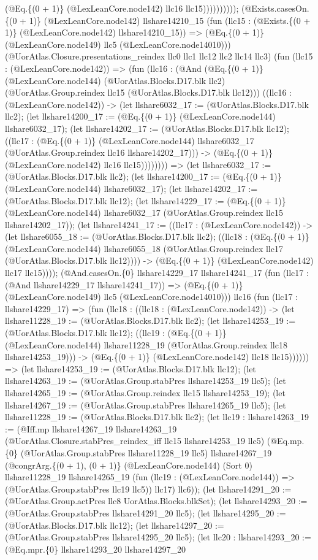\documentclass[11pt]{article}
\begin{document}
(@Eq.\{(0 + 1)\} (@LexLeanCore.node142) llc16 llc15)))))))))); (@Exists.casesOn.\{(0 + 1)\} (@LexLeanCore.node142) llshare14210\_15 (fun (llc15 : (@Exists.\{(0 + 1)\} (@LexLeanCore.node142) llshare14210\_15)) => (@Eq.\{(0 + 1)\} (@LexLeanCore.node149) llc5 (@LexLeanCore.node14010))) (@UorAtlas.Closure.presentations\_reindex llc0 llc1 llc12 llc2 llc14 llc3) (fun (llc15 : (@LexLeanCore.node142)) => (fun (llc16 : (@And (@Eq.\{(0 + 1)\} (@LexLeanCore.node144) (@UorAtlas.Blocks.D17.blk llc2) (@UorAtlas.Group.reindex llc15 (@UorAtlas.Blocks.D17.blk llc12))) ((llc16 : (@LexLeanCore.node142)) -> (let llshare6032\_17 := (@UorAtlas.Blocks.D17.blk llc2); (let llshare14200\_17 := (@Eq.\{(0 + 1)\} (@LexLeanCore.node144) llshare6032\_17); (let llshare14202\_17 := (@UorAtlas.Blocks.D17.blk llc12); ((llc17 : (@Eq.\{(0 + 1)\} (@LexLeanCore.node144) llshare6032\_17 (@UorAtlas.Group.reindex llc16 llshare14202\_17))) -> (@Eq.\{(0 + 1)\} (@LexLeanCore.node142) llc16 llc15)))))))) => (let llshare6032\_17 := (@UorAtlas.Blocks.D17.blk llc2); (let llshare14200\_17 := (@Eq.\{(0 + 1)\} (@LexLeanCore.node144) llshare6032\_17); (let llshare14202\_17 := (@UorAtlas.Blocks.D17.blk llc12); (let llshare14229\_17 := (@Eq.\{(0 + 1)\} (@LexLeanCore.node144) llshare6032\_17 (@UorAtlas.Group.reindex llc15 llshare14202\_17)); (let llshare14241\_17 := ((llc17 : (@LexLeanCore.node142)) -> (let llshare6055\_18 := (@UorAtlas.Blocks.D17.blk llc2); ((llc18 : (@Eq.\{(0 + 1)\} (@LexLeanCore.node144) llshare6055\_18 (@UorAtlas.Group.reindex llc17 (@UorAtlas.Blocks.D17.blk llc12)))) -> (@Eq.\{(0 + 1)\} (@LexLeanCore.node142) llc17 llc15)))); (@And.casesOn.\{0\} llshare14229\_17 llshare14241\_17 (fun (llc17 : (@And llshare14229\_17 llshare14241\_17)) => (@Eq.\{(0 + 1)\} (@LexLeanCore.node149) llc5 (@LexLeanCore.node14010))) llc16 (fun (llc17 : llshare14229\_17) => (fun (llc18 : ((llc18 : (@LexLeanCore.node142)) -> (let llshare11228\_19 := (@UorAtlas.Blocks.D17.blk llc2); (let llshare14253\_19 := (@UorAtlas.Blocks.D17.blk llc12); ((llc19 : (@Eq.\{(0 + 1)\} (@LexLeanCore.node144) llshare11228\_19 (@UorAtlas.Group.reindex llc18 llshare14253\_19))) -> (@Eq.\{(0 + 1)\} (@LexLeanCore.node142) llc18 llc15)))))) => (let llshare14253\_19 := (@UorAtlas.Blocks.D17.blk llc12); (let llshare14263\_19 := (@UorAtlas.Group.stabPres llshare14253\_19 llc5); (let llshare14265\_19 := (@UorAtlas.Group.reindex llc15 llshare14253\_19); (let llshare14267\_19 := (@UorAtlas.Group.stabPres llshare14265\_19 llc5); (let llshare11228\_19 := (@UorAtlas.Blocks.D17.blk llc2); (let llc19 : llshare14263\_19 := (@Iff.mp llshare14267\_19 llshare14263\_19 (@UorAtlas.Closure.stabPres\_reindex\_iff llc15 llshare14253\_19 llc5) (@Eq.mp.\{0\} (@UorAtlas.Group.stabPres llshare11228\_19 llc5) llshare14267\_19 (@congrArg.\{(0 + 1), (0 + 1)\} (@LexLeanCore.node144) (Sort 0) llshare11228\_19 llshare14265\_19 (fun (llc19 : (@LexLeanCore.node144)) => (@UorAtlas.Group.stabPres llc19 llc5)) llc17) llc6)); (let llshare14291\_20 := (@UorAtlas.Group.actPres llc8 UorAtlas.Blocks.blkSet); (let llshare14293\_20 := (@UorAtlas.Group.stabPres llshare14291\_20 llc5); (let llshare14295\_20 := (@UorAtlas.Blocks.D17.blk llc12); (let llshare14297\_20 := (@UorAtlas.Group.stabPres llshare14295\_20 llc5); (let llc20 : llshare14293\_20 := (@Eq.mpr.\{0\} llshare14293\_20 llshare14297\_20 
\end{document}
